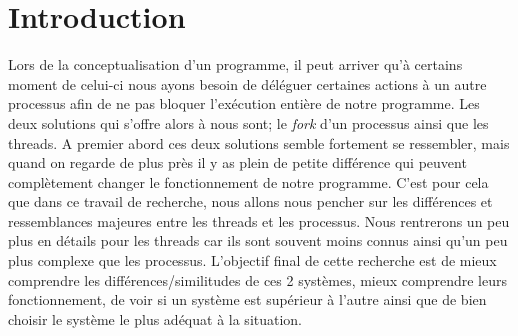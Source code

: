 \section{Introduction}

Lors de la conceptualisation d'un programme, il peut arriver qu'à certains moment de celui-ci nous ayons besoin de déléguer certaines actions à un autre processus afin de ne pas bloquer l'exécution entière de notre programme. Les deux solutions qui s'offre alors à nous sont; le \textit{fork} d'un processus ainsi que les threads. A premier abord ces deux solutions semble fortement se ressembler, mais quand on regarde de plus près il y as plein de petite différence qui peuvent complètement changer le fonctionnement de notre programme. 
C'est pour cela que dans ce travail de recherche, nous allons nous pencher sur les différences et ressemblances majeures entre les threads et les processus. Nous rentrerons un peu plus en détails pour les threads car ils sont souvent moins connus ainsi qu'un peu plus complexe que les processus. L'objectif final de cette recherche est de mieux comprendre les différences/similitudes de ces 2 systèmes, mieux comprendre leurs fonctionnement, de voir si un système est supérieur à l'autre ainsi que de bien choisir le système le plus adéquat à la situation. 